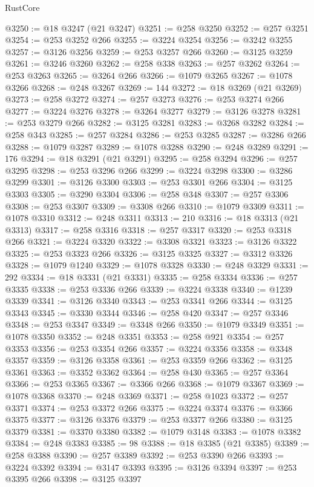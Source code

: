 \begin{lexlean}{RustCore}
\begin{coremodule}
@3250 := @18 @3247 (@21 @3247)
@3251 := @258 @3250
@3252 := @257 @3251
@3254 := @253 @3252 @266
@3255 := @3224 @3254
@3256 := @3242 @3255
@3257 := @3126 @3256
@3259 := @253 @3257 @266
@3260 := @3125 @3259
@3261 := @3246 @3260
@3262 := @258 @338
@3263 := @257 @3262
@3264 := @253 @3263
@3265 := @3264 @266
@3266 := @1079 @3265
@3267 := @1078 @3266
@3268 := @248 @3267
@3269 := 144
@3272 := @18 @3269 (@21 @3269)
@3273 := @258 @3272
@3274 := @257 @3273
@3276 := @253 @3274 @266
@3277 := @3224 @3276
@3278 := @3264 @3277
@3279 := @3126 @3278
@3281 := @253 @3279 @266
@3282 := @3125 @3281
@3283 := @3268 @3282
@3284 := @258 @343
@3285 := @257 @3284
@3286 := @253 @3285
@3287 := @3286 @266
@3288 := @1079 @3287
@3289 := @1078 @3288
@3290 := @248 @3289
@3291 := 176
@3294 := @18 @3291 (@21 @3291)
@3295 := @258 @3294
@3296 := @257 @3295
@3298 := @253 @3296 @266
@3299 := @3224 @3298
@3300 := @3286 @3299
@3301 := @3126 @3300
@3303 := @253 @3301 @266
@3304 := @3125 @3303
@3305 := @3290 @3304
@3306 := @258 @348
@3307 := @257 @3306
@3308 := @253 @3307
@3309 := @3308 @266
@3310 := @1079 @3309
@3311 := @1078 @3310
@3312 := @248 @3311
@3313 := 210
@3316 := @18 @3313 (@21 @3313)
@3317 := @258 @3316
@3318 := @257 @3317
@3320 := @253 @3318 @266
@3321 := @3224 @3320
@3322 := @3308 @3321
@3323 := @3126 @3322
@3325 := @253 @3323 @266
@3326 := @3125 @3325
@3327 := @3312 @3326
@3328 := @1079 @1240
@3329 := @1078 @3328
@3330 := @248 @3329
@3331 := 292
@3334 := @18 @3331 (@21 @3331)
@3335 := @258 @3334
@3336 := @257 @3335
@3338 := @253 @3336 @266
@3339 := @3224 @3338
@3340 := @1239 @3339
@3341 := @3126 @3340
@3343 := @253 @3341 @266
@3344 := @3125 @3343
@3345 := @3330 @3344
@3346 := @258 @420
@3347 := @257 @3346
@3348 := @253 @3347
@3349 := @3348 @266
@3350 := @1079 @3349
@3351 := @1078 @3350
@3352 := @248 @3351
@3353 := @258 @921
@3354 := @257 @3353
@3356 := @253 @3354 @266
@3357 := @3224 @3356
@3358 := @3348 @3357
@3359 := @3126 @3358
@3361 := @253 @3359 @266
@3362 := @3125 @3361
@3363 := @3352 @3362
@3364 := @258 @430
@3365 := @257 @3364
@3366 := @253 @3365
@3367 := @3366 @266
@3368 := @1079 @3367
@3369 := @1078 @3368
@3370 := @248 @3369
@3371 := @258 @1023
@3372 := @257 @3371
@3374 := @253 @3372 @266
@3375 := @3224 @3374
@3376 := @3366 @3375
@3377 := @3126 @3376
@3379 := @253 @3377 @266
@3380 := @3125 @3379
@3381 := @3370 @3380
@3382 := @1079 @3148
@3383 := @1078 @3382
@3384 := @248 @3383
@3385 := 98
@3388 := @18 @3385 (@21 @3385)
@3389 := @258 @3388
@3390 := @257 @3389
@3392 := @253 @3390 @266
@3393 := @3224 @3392
@3394 := @3147 @3393
@3395 := @3126 @3394
@3397 := @253 @3395 @266
@3398 := @3125 @3397

\end{coremodule}
\end{lexlean}
